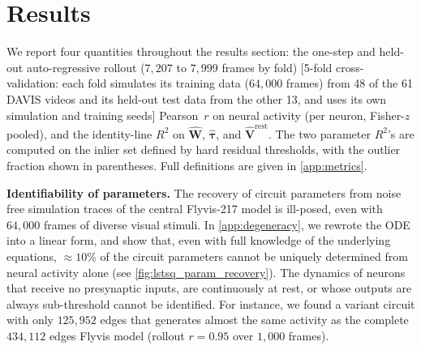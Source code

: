 \documentclass{article}
\begin{document}

\section{Results}



We report four quantities throughout the results section: the one-step and
{\color{revised}held-out auto-regressive rollout ($7{,}207$ to $7{,}999$ frames by fold) [5-fold cross-validation: each fold simulates its training data ($64{,}000$ frames) from 48 of the 61 DAVIS videos and its held-out test data from the other 13, and uses its own simulation and training seeds]} Pearson~$r$ on neural activity
(per neuron, Fisher-$z$ pooled), and the identity-line $R^2$ on
$\hat{\mathbf{W}}$, $\hat{\boldsymbol{\tau}}$, and
$\hat{\mathbf{V}}^{\mathrm{rest}}$. The two parameter $R^2$'s are
computed on the inlier set defined by hard residual thresholds, with
the outlier fraction shown in parentheses. Full definitions are given
in \cref{app:metrics}.


\textbf{Identifiability of parameters.}
The recovery of circuit parameters from noise free simulation traces of the central Flyvis-217 model is ill-posed, even with $64{,}000$ frames of diverse visual stimuli. In \cref{app:degeneracy}, we rewrote the ODE into a linear form, and show that, even with full knowledge of the underlying equations, $\approx 10\%$ of the circuit parameters cannot be uniquely determined from neural activity alone (see \cref{fig:lstsq_param_recovery}). The dynamics of neurons that receive no presynaptic inputs, are continuously at rest, or whose outputs are always sub-threshold cannot be identified.
For instance, we found a variant circuit with only $125{,}952$ edges that generates almost the same activity as the complete $434{,}112$ edges Flyvis model (rollout $r = 0.95$ over $1{,}000$ frames).
\end{document}
